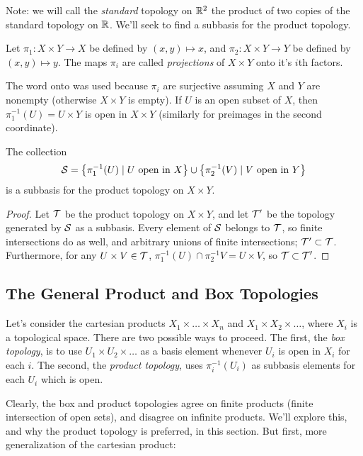 \documentclass[10pt]{report}
\begin{document}
Note: we will call the \emph{standard} topology on $\mathbb{R}^2$ the product of two copies of the standard topology on $\mathbb{R}$.
We'll seek to find a subbasis for the product topology.
\begin{definition}
  Let $\pi_1:X \times Y \rightarrow X$ be defined by $(x,y) \mapsto x$, and $\pi_2:X \times Y \rightarrow Y$ be defined by $(x,y) \mapsto y$.
  The maps $\pi_i$ are called \emph{projections} of $X \times Y$ onto it's $i$th factors.
\end{definition}

The word onto was used because $\pi_i$ are surjective assuming $X$ and $Y$ are nonempty (otherwise $X \times Y$ is empty).
If $U$ is an open subset of $X$, then $\pi_1^{-1}(U) = U \times Y$ is open in $X \times Y$ (similarly for preimages in the second coordinate).

\begin{theorem}
  The collection
  \[
    \mathcal{S} = \left\{  \pi_1^{-1}(U) \mid U \text{ open in } X  \right\} \cup \left\{  \pi_2^{-1}(V) \mid V \text{ open in } Y \right\}
  \]
  is a subbasis for the product topology on $X \times Y$.
\end{theorem}
\begin{proof}
  Let $\mathcal{T}$ be the product topology on $X \times Y$, and let $\mathcal{T}'$ be the topology generated by $\mathcal{S}$ as a subbasis.
  Every element of $\mathcal{S}$ belongs to $\mathcal{T}$, so finite intersections do as well, and arbitrary unions of finite intersections; $\mathcal{T}' \subset \mathcal{T}$.
  Furthermore, for any $U \times V \in \mathcal{T}$, $\pi_1^{-1}(U) \cap \pi_2^{-1}V = U \times V$, so $\mathcal{T} \subset \mathcal{T}'$.
\end{proof}

\subsection{The General Product and Box Topologies}
Let's consider the cartesian products $X_1 \times \dots \times X_n$ and $X_1 \times X_2 \times \dots$, where $X_i$ is a topological space.
There are two possible ways to proceed.
The first, the \emph{box topology}, is to use $U_1 \times U_2 \times \dots$ as a basis element whenever $U_i$ is open in $X_i$ for each $i$.
The second, the \emph{product topology}, uses $\pi_i^{-1}(U_i)$ as subbasis elements for each $U_i$ which is open.

Clearly, the box and product topologies agree on finite products (finite intersection of open sets), and disagree on infinite products.
We'll explore this, and why the product topology is preferred, in this section.
But first, more generalization of the cartesian product:
\end{document}
